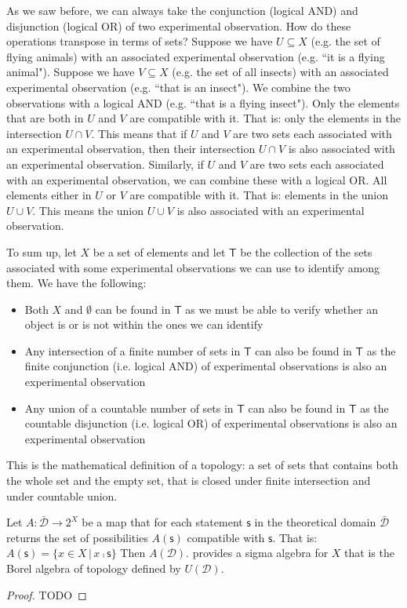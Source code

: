 \documentclass[11pt,letterpaper,fleqn]{memoir} %
\begin{document}
As we saw before, we can always take the conjunction (logical AND) and disjunction (logical OR) of two experimental observation. How do these operations transpose in terms of sets? Suppose we have $U \subseteq X$ (e.g. the set of flying animals) with an associated experimental observation (e.g. ``it is a flying animal"). Suppose we have $V \subseteq X$ (e.g. the set of all insects) with an associated experimental observation (e.g. ``that is an insect"). We combine the two observations with a logical AND (e.g. ``that is a flying insect"). Only the elements that are both in $U$ and $V$ are compatible with it. That is: only the elements in the intersection $U \cap V$. This means that if $U$ and $V$ are two sets each associated with an experimental observation, then their intersection $U \cap V$ is also associated with an experimental observation. Similarly, if $U$ and $V$ are two sets each associated with an experimental observation, we can combine these with a logical OR. All elements either in $U$ or $V$ are compatible with it. That is: elements in the union $U \cup V$. This means the union $U \cup V$ is also associated with an experimental observation.

To sum up, let $X$ be a set of elements and let $\mathsf{T}$ be the collection of the sets associated with some experimental observations we can use to identify among them. We have the following:
\begin{itemize}
	\item Both $X$ and $\emptyset$ can be found in $\mathsf{T}$ as we must be able to verify whether an object is or is not within the ones we can identify
	\item Any intersection of a finite number of sets in $\mathsf{T}$ can also be found in $\mathsf{T}$ as the finite conjunction (i.e. logical AND) of experimental observations is also an experimental observation
	\item Any union of a countable number of sets in $\mathsf{T}$ can also be found in $\mathsf{T}$ as the countable disjunction (i.e. logical OR) of experimental observations is also an experimental observation
\end{itemize}
This is the mathematical definition of a topology: a set of sets that contains both the whole set and the empty set, that is closed under finite intersection and under countable union. 

\begin{mathSection}

\begin{prop}
	Let $A : \bar{\mathcal{D}} \rightarrow 2^X$ be a map that for each statement $\mathsf{s}$ in the theoretical domain $\bar{\mathcal{D}}$ returns the set of possibilities $A(\mathsf{s})$ compatible with $\mathsf{s}$. That is: $A(\mathsf{s})=\{ x \in X \, | \, x \comp \mathsf{s}\}$ Then $A(\mathcal{D})$. provides a sigma algebra for $X$ that is the Borel algebra of topology defined by $U(\mathcal{D})$.
\end{prop}

\begin{proof}
	TODO
\end{proof}

\end{mathSection}
\end{document}
